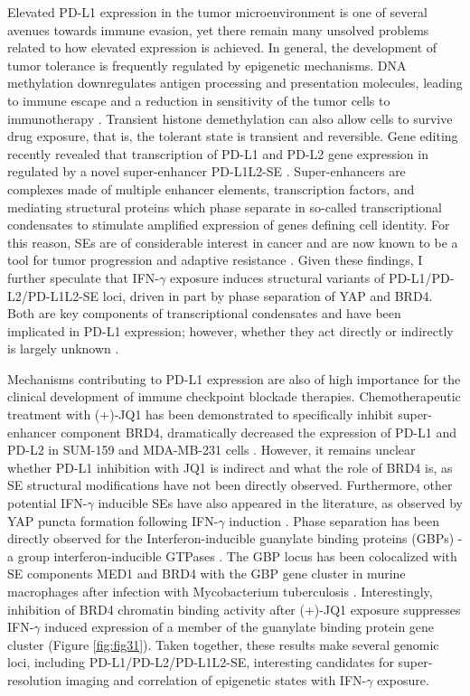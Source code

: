Elevated PD-L1 expression in the tumor microenvironment is one of several avenues towards immune evasion, yet there remain many unsolved problems related to how elevated expression is achieved.  In general, the development of tumor tolerance is frequently regulated by epigenetic mechanisms. DNA methylation downregulates antigen processing and presentation molecules, leading to immune escape and a reduction in sensitivity of the tumor cells to immunotherapy \parencite{Li2021}. Transient histone demethylation can also allow cells to survive drug exposure, that is, the tolerant state is transient and reversible. Gene editing recently revealed that transcription of PD-L1 and PD-L2 gene expression in regulated by a novel super-enhancer PD-L1L2-SE \parencite{Xu2019}. Super-enhancers are complexes made of multiple enhancer elements, transcription factors, and mediating structural proteins which phase separate in so-called transcriptional condensates to stimulate amplified expression of genes defining cell identity. For this reason, SEs are of considerable interest in cancer and are now known to be a tool for tumor progression and adaptive resistance \parencite{Xu2019}. Given these findings, I further speculate that IFN-$\gamma$ exposure induces structural variants of PD-L1/PD-L2/PD-L1L2-SE loci, driven in part by phase separation of YAP and BRD4. Both are key components of transcriptional condensates and have been implicated in PD-L1 expression; however, whether they act directly or indirectly is largely unknown \parencite{Xu2019,Yu2021}.

Mechanisms contributing to PD-L1 expression are also of high importance for the clinical development of immune checkpoint blockade therapies. Chemotherapeutic treatment with (+)-JQ1 has been demonstrated to specifically inhibit super-enhancer component BRD4, dramatically decreased the expression of PD-L1 and PD-L2 in SUM-159 and MDA-MB-231 cells \parencite{Xu2019}. However, it remains unclear whether PD-L1 inhibition with JQ1 is indirect and what the role of BRD4 is, as SE structural modifications have not been directly observed. Furthermore, other potential IFN-$\gamma$ inducible SEs have also appeared in the literature, as observed by YAP puncta formation following IFN-$\gamma$ induction \parencite{Yu2021}. Phase separation has been directly observed for the Interferon-inducible guanylate binding proteins (GBPs) - a group interferon-inducible GTPases \parencite{Siwek2020}. The GBP locus has been colocalized with SE components MED1 and BRD4 with the GBP gene cluster in murine macrophages after infection with Mycobacterium tuberculosis \parencite{Lin2022}. Interestingly, inhibition of BRD4 chromatin binding activity after (+)-JQ1 exposure suppresses IFN-$\gamma$ induced expression of a member of the guanylate binding protein gene cluster (Figure \ref{fig:fig31}). Taken together, these results make several genomic loci, including PD-L1/PD-L2/PD-L1L2-SE, interesting candidates for super-resolution imaging and correlation of epigenetic states with IFN-$\gamma$ exposure.

